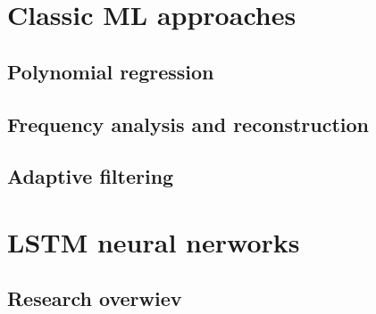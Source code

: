 \section{Classic ML approaches}

\subsection{Polynomial regression}

\subsection{Frequency analysis and reconstruction}

\subsection{Adaptive filtering}


\section{LSTM neural nerworks}

\subsection{Research overwiev}
